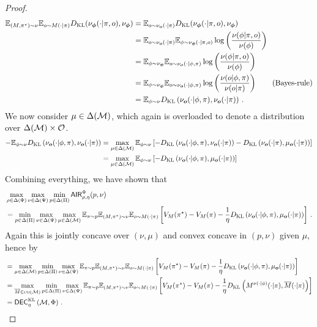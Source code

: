 \begin{proof}
    \begin{align*}
        \E_{(M,\pi^\star)\sim \nu}\E_{o\sim M(\cdot|\pi)} \KL(\nu_{\bo{\phi}}(\cdot|\pi, o), \nu_{\bo{\phi}})  
        &=\E_{o\sim \nu_{\bo{o}}(\cdot|\pi)} \KL(\nu_{\bo{\phi}}(\cdot|\pi, o), \nu_{\bo{\phi}})  \\
        &=\E_{o\sim \nu_{\bo{o}}(\cdot|\pi)}\E_{\phi\sim\nu_{\bo{\phi}}(\cdot|\pi, o)} \log\left(\frac{\nu(\phi|\pi, o)}{\nu(\phi)}\right)  \\
        &=\E_{\phi\sim \nu_{\bo{\phi}}}\E_{o\sim\nu_{\bo{o}}(\cdot|\phi,\pi)} \log\left(\frac{\nu(\phi|\pi, o)}{\nu(\phi)}\right)  \\
        &=\E_{\phi\sim \nu_{\bo{\phi}}}\E_{o\sim\nu_{\bo{o}}(\cdot|\phi,\pi)} \log\left(\frac{\nu(o|\phi,\pi)}{\nu(o|\pi)}\right)  \tag{Bayes-rule}\\
        &= \E_{\phi\sim \nu} \KL\left( \nu_{\bo{o}}(\cdot|\phi,\pi),  \nu_{\bo{o}}(\cdot|\pi) \right)\,.
    \end{align*}
    We now consider $\mu\in\Delta(\mathcal{M})$, which again is overloaded to denote a distribution over $\Delta(\mathcal{M})\times\mathcal{O}$.
    \begin{align*}
    -\E_{\phi\sim \nu} \KL\left( \nu_{\bo{o}}(\cdot|\phi,\pi),  \nu_{\bo{o}}(\cdot|\pi) \right) &= \max_{\mu\in\Delta(\calM)} \E_{\phi\sim \nu} \left[-\KL\left( \nu_{\bo{o}}(\cdot|\phi,\pi),  \nu_{\bo{o}}(\cdot|\pi) \right)-\KL\left( \nu_{\bo{o}}(\cdot|\pi),\mu_{\bo{o}}(\cdot|\pi) \right)\right]\\
    &=\max_{\mu\in\Delta(\calM)} \E_{\phi\sim \nu} \left[-\KL\left( \nu_{\bo{o}}(\cdot|\phi,\pi),  \mu_{\bo{o}}(\cdot|\pi) \right)\right]
    \end{align*}
Combining everything, we have shown that
\begin{align*}
    &\max_{\rho \in \Delta(\Phi)}\max_{\nu\in \Delta(\Psi)} \min_{p\in\Delta(\Pi)}\air^\Phi_{\rho,\eta}(p,\nu) \\
    &= \min_{p\in\Delta(\Pi)} \max_{\nu\in \Delta(\Psi)}\max_{\mu\in\Delta(\calM)}\E_{\pi\sim p} \E_{(M,\pi^\star)\sim \nu} \E_{o\sim M(\cdot|\pi)}\left[ V_{M}(\pi^\star) -  V_{M}(\pi) - \frac{1}{\eta}\KL\left( \nu_{\bo{o}}(\cdot|\phi,\pi),  \mu_{\bo{o}}(\cdot|\pi) \right)\right]\,.
\end{align*}
Again this is jointly concave over $(\nu,\mu)$ and convex concave in $(p,\nu)$ given $\mu$, hence by 
\begin{align*}
    &= \max_{\mu\in\Delta(\calM)}\min_{p\in\Delta(\Pi)} \max_{\nu\in \Delta(\Psi)}\E_{\pi\sim p} \E_{(M,\pi^\star)\sim \nu} \E_{o\sim M(\cdot|\pi)}\left[ V_{M}(\pi^\star) -  V_{M}(\pi) - \frac{1}{\eta}\KL\left( \nu_{\bo{o}}(\cdot|\phi,\pi),  \mu_{\bo{o}}(\cdot|\pi) \right)\right]\\
    &= \max_{\bar M\in\co(\calM)}\min_{p\in\Delta(\Pi)} \max_{\nu\in \Delta(\Psi)}\E_{\pi\sim p} \E_{(M,\pi^\star)\sim \nu} \E_{o\sim M(\cdot|\pi)}\left[ V_{M}(\pi^\star) -  V_{M}(\pi) - \frac{1}{\eta}\KL\left( M^{\nu(\cdot|\phi)}(\cdot|\pi),  \bar M(\cdot|\pi) \right)\right]\\
    &= \dec_{\eta}^{\textsc{KL}}\left(\calM, \Phi\right)\,.
\end{align*}
\end{proof}

